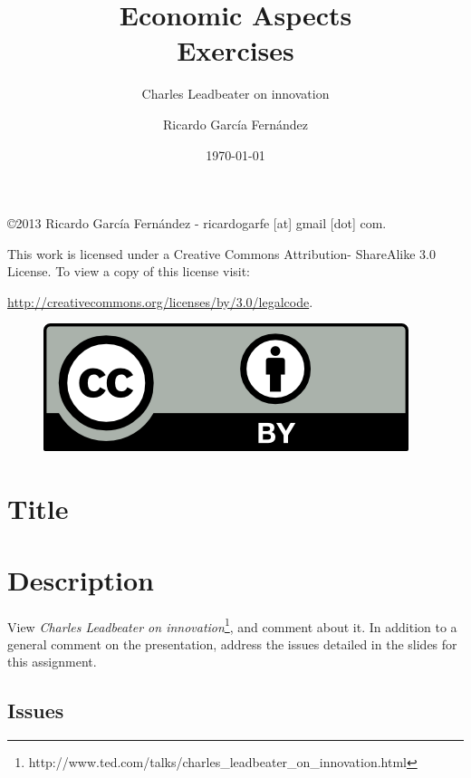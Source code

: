 \documentclass[11pt]{scrartcl}
\title{\textbf{Economic Aspects\\
                Exercises}}
\subtitle{Charles Leadbeater on innovation}
\author{Ricardo Garc\'ia Fern\'andez}
\date{\today}
\begin{document}
\maketitle

\vfill

\begin{flushright}
    \copyright  2013 Ricardo Garc\'ia Fern\'andez - ricardogarfe [at] gmail [dot] com.

    This work is licensed under a Creative Commons Attribution- ShareAlike 3.0 License.
    To view a copy of this license visit:
 
    \url{http://creativecommons.org/licenses/by/3.0/legalcode}.
\end{flushright}

\begin{figure}[h]
    \begin{flushright}	
        \includegraphics{by}
        \label{fig:by-sa}
    \end{flushright}
\end{figure}

\newpage

\section{Title}

\section{Description}

View \emph{Charles Leadbeater on innovation}\footnote{http://www.ted.com/talks/charles\_leadbeater\_on\_innovation.html}, and comment about it. In addition to a general comment on the presentation, address the issues detailed in the slides for this assignment.

\subsection{Issues}
\end{document}
